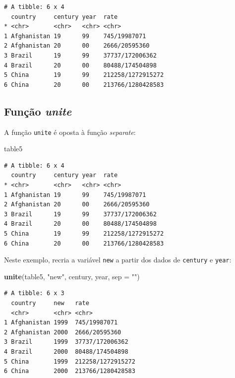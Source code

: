 \documentclass[12pt,brazil,oneside]{book}
\newenvironment{Shaded}{\begin{snugshade}}{\end{snugshade}}
\newcommand{\DataTypeTok}[1]{\textcolor[rgb]{0.13,0.29,0.53}{#1}}
\newcommand{\KeywordTok}[1]{\textcolor[rgb]{0.13,0.29,0.53}{\textbf{#1}}}
\newcommand{\NormalTok}[1]{#1}
\newcommand{\StringTok}[1]{\textcolor[rgb]{0.31,0.60,0.02}{#1}}
\begin{document}
\begin{verbatim}
# A tibble: 6 x 4
  country     century year  rate             
* <chr>       <chr>   <chr> <chr>            
1 Afghanistan 19      99    745/19987071     
2 Afghanistan 20      00    2666/20595360    
3 Brazil      19      99    37737/172006362  
4 Brazil      20      00    80488/174504898  
5 China       19      99    212258/1272915272
6 China       20      00    213766/1280428583
\end{verbatim}

\hypertarget{funcao-unite}{%
\subsection{\texorpdfstring{Função \emph{unite}}{Função unite}}\label{funcao-unite}}

A função \texttt{unite} é oposta à função \emph{separate}:

\begin{Shaded}
\begin{Highlighting}[]
\NormalTok{table5}
\end{Highlighting}
\end{Shaded}

\begin{verbatim}
# A tibble: 6 x 4
  country     century year  rate             
* <chr>       <chr>   <chr> <chr>            
1 Afghanistan 19      99    745/19987071     
2 Afghanistan 20      00    2666/20595360    
3 Brazil      19      99    37737/172006362  
4 Brazil      20      00    80488/174504898  
5 China       19      99    212258/1272915272
6 China       20      00    213766/1280428583
\end{verbatim}

Neste exemplo, recria a variável \texttt{new} a partir dos dados de \texttt{century} e \texttt{year}:

\begin{Shaded}
\begin{Highlighting}[]
\KeywordTok{unite}\NormalTok{(table5, }\StringTok{"new"}\NormalTok{, century, year, }\DataTypeTok{sep =} \StringTok{""}\NormalTok{)}
\end{Highlighting}
\end{Shaded}

\begin{verbatim}
# A tibble: 6 x 3
  country     new   rate             
  <chr>       <chr> <chr>            
1 Afghanistan 1999  745/19987071     
2 Afghanistan 2000  2666/20595360    
3 Brazil      1999  37737/172006362  
4 Brazil      2000  80488/174504898  
5 China       1999  212258/1272915272
6 China       2000  213766/1280428583
\end{verbatim}
\end{document}
